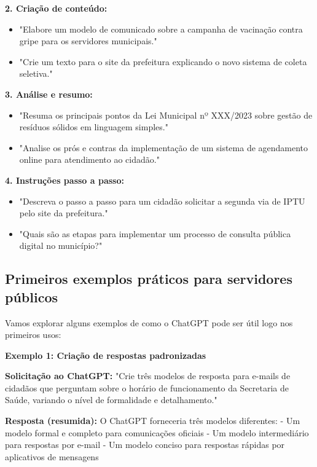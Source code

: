 \documentclass[12pt,a4paper]{book}
\begin{document}
\textbf{2. Criação de conteúdo:}
\begin{itemize}
    \item "Elabore um modelo de comunicado sobre a campanha de vacinação contra gripe para os servidores municipais."
    \item "Crie um texto para o site da prefeitura explicando o novo sistema de coleta seletiva."
\end{itemize}

\textbf{3. Análise e resumo:}
\begin{itemize}
    \item "Resuma os principais pontos da Lei Municipal nº XXX/2023 sobre gestão de resíduos sólidos em linguagem simples."
    \item "Analise os prós e contras da implementação de um sistema de agendamento online para atendimento ao cidadão."
\end{itemize}

\textbf{4. Instruções passo a passo:}
\begin{itemize}
    \item "Descreva o passo a passo para um cidadão solicitar a segunda via de IPTU pelo site da prefeitura."
    \item "Quais são as etapas para implementar um processo de consulta pública digital no município?"
\end{itemize}

\subsection{Primeiros exemplos práticos para servidores públicos}

Vamos explorar alguns exemplos de como o ChatGPT pode ser útil logo nos primeiros usos:

\begin{tcolorbox}[exemplo]
\textbf{Exemplo 1: Criação de respostas padronizadas}

\textbf{Solicitação ao ChatGPT:}
"Crie três modelos de resposta para e-mails de cidadãos que perguntam sobre o horário de funcionamento da Secretaria de Saúde, variando o nível de formalidade e detalhamento."

\textbf{Resposta (resumida):}
O ChatGPT forneceria três modelos diferentes:
- Um modelo formal e completo para comunicações oficiais
- Um modelo intermediário para respostas por e-mail
- Um modelo conciso para respostas rápidas por aplicativos de mensagens
\end{tcolorbox}
\end{document}
